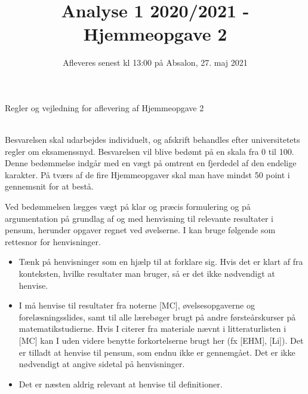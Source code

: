 \documentclass{article}
\title{Analyse 1 2020/2021 - Hjemmeopgave 2}
\author{}
\date{\vspace{-1cm}Afleveres senest kl 13:00 på Absalon, 27. maj 2021}
\begin{document}
	
	\maketitle
	
	\noindent
	
	
	
	
	\newpage
	\noindent
	{\LARGE Regler og vejledning for aflevering af Hjemmeopgave 2}
	
	\noindent\hrulefill \\
	
	\noindent
	Besvarelsen skal udarbejdes individuelt, og afskrift behandles efter universitetets regler om eksamenssnyd. Besvarelsen vil blive bedømt på en skala fra 0 til 100. Denne bedømmelse indgår med en vægt på omtrent en fjerdedel af den endelige karakter. På tværs af de fire Hjemmeopgaver skal man have mindst 50 point i gennemsnit for at bestå.
	
	Ved bedømmelsen lægges vægt på klar og præcis formulering og på argumentation på grundlag af og med henvisning til relevante resultater i pensum, herunder opgaver regnet ved øvelserne. I kan bruge følgende som rettesnor for henvisninger.
	\begin{itemize}
		\item Tænk på henvisninger som en hjælp til at forklare sig. Hvis det er klart af fra konteksten, hvilke resultater man bruger, så er det ikke nødvendigt at henvise.
		
		\item I må henvise til resultater fra noterne [MC], øvelsesopgaverne og forelæsningsslides, samt til alle l\ae{}reb\o{}ger brugt p\aa{} andre f\o{}rste\aa{}rskurser p\aa{} matematikstudierne. Hvis I citerer fra materiale n\ae{}vnt i litteraturlisten i [MC] kan I uden videre benytte forkortelserne brugt her (fx [EHM], [Li]). Det er tilladt at henvise til pensum, som endnu ikke er gennemgået. Det er ikke nødvendigt at angive sidetal på henvisninger. 
		
		\item Det er næsten aldrig relevant at henvise til definitioner.
	\end{itemize}
	
	
\end{document}

